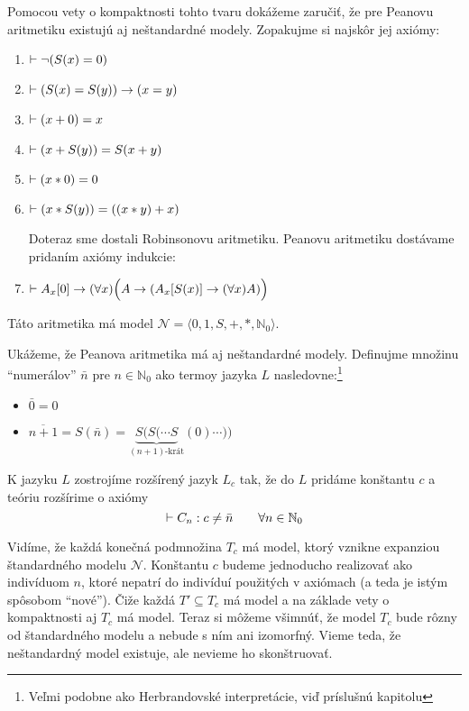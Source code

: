 \begin{priklad}
    Pomocou vety o kompaktnosti tohto tvaru dokážeme zaručiť,
    že pre Peanovu aritmetiku existujú aj neštandardné modely.
    Zopakujme si najskôr jej axiómy:

    \begin{enumerate}
    \item $\vdash \neg (S(x) = 0)$
    \item $\vdash (S(x) = S(y)) \rightarrow (x=y)$
    \item $\vdash (x+0) = x$
    \item $\vdash (x+S(y)) = S(x+y)$
    \item $\vdash (x * 0) = 0$
    \item $\vdash (x * S(y)) = ((x*y)+x)$
    \par \noindent Doteraz sme dostali Robinsonovu aritmetiku. Peanovu
    aritmetiku dostávame pridaním axiómy indukcie:
    \item $\vdash A_x[0] \rightarrow (\forall x)\Big(A \rightarrow (
            A_x[S(x)] \rightarrow (\forall x)A)\Big)$
    \end{enumerate}
    Táto aritmetika má model 
    $\mathcal{N} = \langle 0,1,S,+,*,\mathbb{N}_0 \rangle$.

    Ukážeme, že Peanova aritmetika má aj neštandardné modely.
    Definujme množinu ``numerálov'' $\bar{n}$ pre $n\in\mathbb{N}_0$
    ako termoy jazyka $L$ nasledovne:\footnote{Veľmi podobne ako
        Herbrandovské interpretácie, viď príslušnú kapitolu}
    \begin{itemize}
    \item $\bar{0} = 0$
    \item $\overline{n+1} = S(\bar{n}) = 
        \underbrace{S(S( \cdots S}_{(n+1)\mbox{-krát}}(0) \cdots ))$
    \end{itemize}

    K jazyku $L$ zostrojíme rozšírený jazyk $L_c$ tak,
    že do $L$ pridáme konštantu $c$ a
    teóriu rozšírime o axiómy
    \begin{equation*}
        \vdash C_n: c \not= \bar{n} \quad\quad \forall n\in\mathbb{N}_0
    \end{equation*}

    Vidíme, že každá konečná podmnožina $T_c$ má model,
    ktorý vznikne expanziou štandardného modelu $\mathcal{N}$.
    Konštantu $c$ budeme jednoducho realizovať ako indivíduom $n$,
    ktoré nepatrí do indivíduí použitých v axiómach (a teda je istým
    spôsobom ``nové'').
    Čiže každá $T' \subseteq T_c$ má model a na základe vety o kompaktnosti 
    aj $T_c$ má model. Teraz si môžeme všimnúť, že model $T_c$ bude rôzny
    od štandardného modelu a nebude s ním ani izomorfný.
    Vieme teda, že neštandardný model existuje, ale nevieme ho skonštruovať.
\end{priklad}
